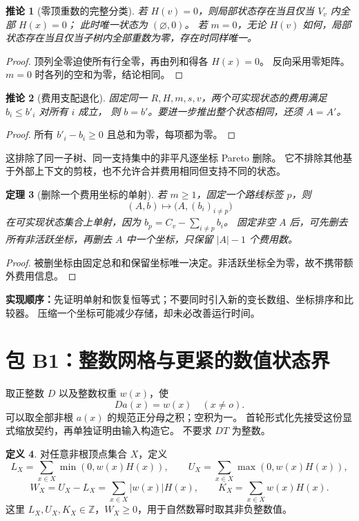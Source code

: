 \documentclass[UTF8,a4paper,11pt]{ctexart}
\newtheorem{theorem}{定理}[section]
\newtheorem{corollary}[theorem]{推论}
\theoremstyle{definition}
\newtheorem{definition}[theorem]{定义}
\newcommand{\Z}{\mathbb Z}
\begin{document}
\begin{corollary}[零顶重数的完整分类]
若 $H(v)=0$，则局部状态存在当且仅当 $V_v$ 内全部 $H(x)=0$；
此时唯一状态为 $(\varnothing,0)$。
若 $m=0$，无论 $H(v)$ 如何，局部状态存在当且仅当子树内全部重数为零，存在时同样唯一。
\end{corollary}
\begin{proof}
顶列全零迫使所有行全零，再由列和得各 $H(x)=0$。
反向采用零矩阵。$m=0$ 时各列的空和为零，结论相同。
\end{proof}

\begin{corollary}[费用支配退化]
固定同一 $R,H,m,s,v$，两个可实现状态的费用满足 $b_i\le b'_i$ 对所有 $i$ 成立，
则 $b=b'$。要进一步推出整个状态相同，还须 $A=A'$。
\end{corollary}
\begin{proof}
所有 $b'_i-b_i\ge0$ 且总和为零，每项都为零。
\end{proof}
这排除了同一子树、同一支持集中的非平凡逐坐标 Pareto 删除。
它不排除其他基于外部上下文的剪枝，也不允许合并费用相同但支持不同的状态。

\begin{theorem}[删除一个费用坐标的单射]
若 $m\ge1$，固定一个路线标签 $p$，则
\[
 (A,b)\longmapsto\bigl(A,(b_i)_{i\ne p}\bigr)
\]
在可实现状态集合上单射，因为
$b_p=C_v-\sum_{i\ne p}b_i$。
固定非空 $A$ 后，可先删去所有非活跃坐标，再删去 $A$ 中一个坐标，只保留 $|A|-1$ 个费用数。
\end{theorem}
\begin{proof}
被删坐标由固定总和和保留坐标唯一决定。非活跃坐标全为零，故不携带额外费用信息。
\end{proof}
\textbf{实现顺序：}先证明单射和恢复恒等式；不要同时引入新的变长数组、坐标排序和比较器。
压缩一个坐标可能减少存储，却未必改善运行时间。

\section{包 B1：整数网格与更紧的数值状态界}

取正整数 $D$ 以及整数权重 $w(x)$，使
\[
 D a(x)=w(x)\quad(x\ne o).
\]
可以取全部非根 $a(x)$ 的规范正分母之积；空积为一。
首轮形式化先接受这份显式缩放契约，再单独证明由输入构造它。
不要求 $DT$ 为整数。

\begin{definition}
对任意非根顶点集合 $X$，定义
\[
 L_X=\sum_{x\in X}\min(0,w(x)H(x)),\qquad
 U_X=\sum_{x\in X}\max(0,w(x)H(x)),
\]
\[
 W_X=U_X-L_X=\sum_{x\in X}|w(x)|H(x),\qquad
 K_X=\sum_{x\in X}w(x)H(x).
\]
这里 $L_X,U_X,K_X\in\Z$，$W_X\ge0$，用于自然数幂时取其非负整数值。
\end{definition}
\end{document}
